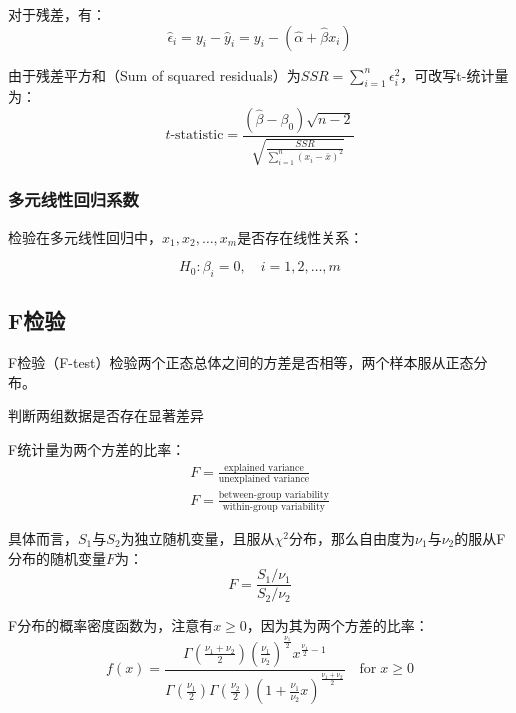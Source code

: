 \documentclass[11pt]{article}
\begin{document}
对于残差，有：
\begin{equation*}
    \hat{\epsilon}_i = y_i - \hat{y}_i = y_i - (\hat{\alpha} + \hat{\beta} x_i )
\end{equation*}

由于残差平方和（Sum of squared residuals）为$SSR=\sum_{i=1}^n \epsilon_i^2$，可改写t-统计量为：
\begin{equation*}
    t\text{-statistic} = \frac{(\hat{\beta} - \beta_0)\sqrt{n-2}}{\sqrt{\frac{SSR}{\sum_{i=1}^{n} (x_i - \bar{x})^2}}}
\end{equation*}

\subsubsection{多元线性回归系数}

检验在多元线性回归中，$x_1,x_2,\dots,x_m$是否存在线性关系：

\begin{equation*}
    H_0: \beta_i = 0, \quad i=1,2,\dots,m
\end{equation*}

\subsection{F检验}

F检验（F-test）检验两个正态总体之间的方差是否相等，两个样本服从正态分布。

判断两组数据是否存在显著差异

F统计量为两个方差的比率：
\begin{gather*}
    F = \frac{\text{explained variance}}{\text{unexplained variance}} \\
    F = \frac{\text{between-group variability}}{\text{within-group variability}} 
\end{gather*}

具体而言，$S_1$与$S_2$为独立随机变量，且服从$\chi^2$分布，那么自由度为$\nu_1$与$\nu_2$的服从F分布的随机变量$F$为：
\begin{equation*}
    F = \frac{S_1/\nu_1}{S_2/\nu_2}
\end{equation*}

F分布的概率密度函数为，注意有$x\geq 0$，因为其为两个方差的比率：
\begin{equation*}
    f(x) = \frac{\Gamma\left(\frac{\nu_1+\nu_2}{2}\right)\left(\frac{\nu_1}{\nu_2}\right)^{\frac{\nu_1}{2}} x^{\frac{\nu_1}{2}-1}}{\Gamma\left(\frac{\nu_1}{2}\right)\Gamma\left(\frac{\nu_2}{2}\right)\left(1+\frac{\nu_1}{\nu_2}x\right)^{\frac{\nu_1+\nu_2}{2}}} \quad \text{for}\; x\geq 0
\end{equation*}
\end{document}
